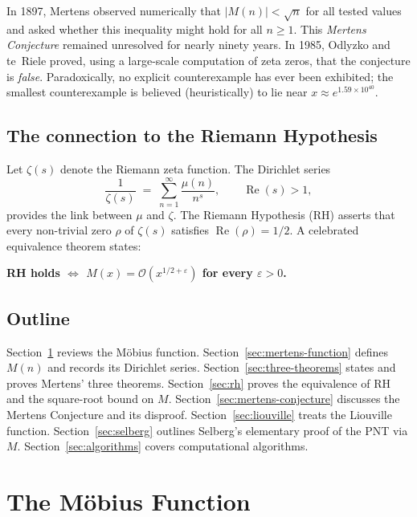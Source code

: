 \documentclass[12pt,a4paper]{amsart}
\theoremstyle{definition}
\newcommand{\BigO}{\mathcal{O}}
\begin{document}
In 1897, Mertens observed numerically that $|M(n)| < \sqrt{n}$ for all tested
values and asked whether this inequality might hold for all $n \ge 1$.  This
\emph{Mertens Conjecture} remained unresolved for nearly ninety years.  In
1985, Odlyzko and te~Riele \cite{OdlyzkoTeRiele1985} proved, using a
large-scale computation of zeta zeros, that the conjecture is \emph{false}.
Paradoxically, no explicit counterexample has ever been exhibited; the
smallest counterexample is believed (heuristically) to lie near
$x \approx e^{1.59 \times 10^{40}}$.

\subsection*{The connection to the Riemann Hypothesis}

Let $\zeta(s)$ denote the Riemann zeta function.  The Dirichlet series
\[
  \frac{1}{\zeta(s)} \;=\; \sum_{n=1}^{\infty} \frac{\mu(n)}{n^s},
  \qquad \operatorname{Re}(s) > 1,
\]
provides the link between $\mu$ and $\zeta$.  The Riemann Hypothesis (RH)
asserts that every non-trivial zero $\rho$ of $\zeta(s)$ satisfies
$\operatorname{Re}(\rho) = 1/2$.  A celebrated equivalence theorem states:

\begin{center}
  \textbf{RH holds $\Longleftrightarrow$ $M(x) = \BigO(x^{1/2+\varepsilon})$
  for every $\varepsilon > 0$.}
\end{center}

\subsection*{Outline}

Section~\ref{sec:mobius} reviews the Möbius function.
Section~\ref{sec:mertens-function} defines $M(n)$ and records its Dirichlet
series.
Section~\ref{sec:three-theorems} states and proves Mertens' three theorems.
Section~\ref{sec:rh} proves the equivalence of RH and the square-root bound on
$M$.
Section~\ref{sec:mertens-conjecture} discusses the Mertens Conjecture and its
disproof.
Section~\ref{sec:liouville} treats the Liouville function.
Section~\ref{sec:selberg} outlines Selberg's elementary proof of the PNT via
$M$.
Section~\ref{sec:algorithms} covers computational algorithms.

\section{The Möbius Function}
\label{sec:mobius}
\end{document}
